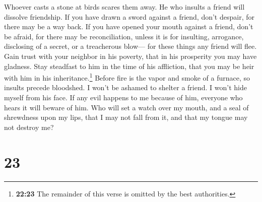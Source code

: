  Whoever casts a stone at birds scares them away. He who
insults a friend will dissolve friendship.  If you have
drawn a sword against a friend, don't despair, for there may be a way
back.  If you have opened your mouth against a friend,
don't be afraid, for there may be reconciliation, unless it is for
insulting, arrogance, disclosing of a secret, or a treacherous blow---
for these things any friend will flee.  Gain trust with
your neighbor in his poverty, that in his prosperity you may have
gladness. Stay steadfast to him in the time of his affliction, that you
may be heir with him in his inheritance.\footnote{\textbf{22:23} The
  remainder of this verse is omitted by the best authorities.}
 Before fire is the vapor and smoke of a furnace, so
insults precede bloodshed.  I won't be ashamed to shelter
a friend. I won't hide myself from his face.  If any evil
happens to me because of him, everyone who hears it will beware of him.
 Who will set a watch over my mouth, and a seal of
shrewdness upon my lips, that I may not fall from it, and that my tongue
may not destroy me?

\hypertarget{section-19}{%
\section{23}\label{section-19}}

